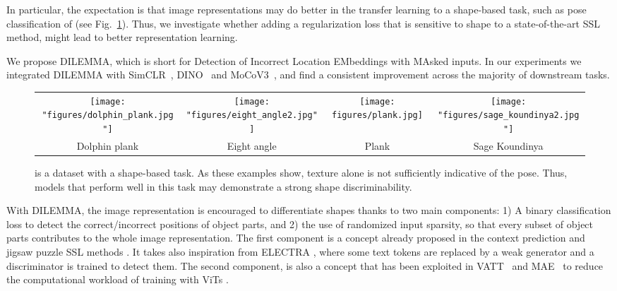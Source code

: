 \documentclass[letterpaper]{article} \usepackage{aaai23}  \usepackage{times}  \usepackage{helvet}  \usepackage{courier}  \usepackage[hyphens]{url}  \usepackage{graphicx} \urlstyle{rm} \def\UrlFont{\rm}  \usepackage{natbib}  \usepackage{caption} \frenchspacing  \setlength{\pdfpagewidth}{8.5in}  \setlength{\pdfpageheight}{11in}  \usepackage{algorithm}
\newcommand{\methodname}{DILEMMA}
\newcommand{\methodnameexpansion}{Detection of Incorrect Location EMbeddings with MAsked inputs}
\begin{document}
In particular, the expectation is that image representations may do better in the transfer learning to a shape-based task, such as pose classification of   (see Fig.~\ref{fig:yoga82}). Thus, we investigate whether adding a regularization loss that is sensitive to shape to a state-of-the-art SSL method, might lead to better representation learning.

We propose {\methodname}, which is short for \methodnameexpansion. In our experiments we integrated {\methodname} with SimCLR~\cite{chen2020simple}, DINO~\cite{caron2021emerging} and MoCoV3~\cite{chen2021empirical}, and find a consistent improvement across the majority of downstream tasks.

\begin{figure}[t]
	\centering
    \newlength{\yfh} \setlength{\yfh}{0.1\textwidth}
    \newlength{\yfw} \setlength{\yfw}{0.115\textwidth}
    \begin{adjustbox}{width=\columnwidth}
    \begin{tabular}{cccc}
	    \texttt{[image: "figures/dolphin\_plank.jpg"]} &
	    \texttt{[image: "figures/eight\_angle2.jpg"]} &
		\texttt{[image: figures/plank.jpg]} &
		\texttt{[image: "figures/sage\_koundinya2.jpg"]} \\
        \footnotesize{Dolphin plank} & \footnotesize{Eight angle} & \footnotesize{Plank} & \footnotesize{Sage Koundinya}
    \end{tabular}
    \end{adjustbox}
	\caption{ is a dataset with a shape-based task. As these examples show, texture alone is not sufficiently indicative of the pose. Thus, models that perform well in this task may demonstrate a strong shape discriminability.}
	\label{fig:yoga82}
\end{figure}

With \methodname, the image representation is encouraged to differentiate shapes thanks to two main components: 1) A binary classification loss to detect the correct/incorrect positions of object parts, and 2) the use of randomized input sparsity, so that every subset of object parts contributes to the whole image representation.
The first component is a concept already proposed in the context prediction \cite{doersch2015unsupervised} and jigsaw puzzle SSL methods \cite{noroozi2016unsupervised}.
It takes also inspiration from ELECTRA \cite{clark2020electra}, where some text tokens are replaced by a weak generator and a discriminator is trained to detect them. The second component, is also a concept that has been exploited in 
VATT~\cite{akbari2021vatt} and MAE~\cite{he2021masked} to reduce the computational workload of training with ViTs \cite{dosovitskiy2020image}.
\end{document}
